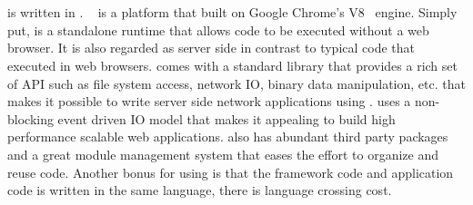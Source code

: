 








\section{\nodejs}

\cb is written in \nodejs.
\nodejs~\cite{tilkov2010node} is a platform that built on Google Chrome's V8~\cite{v8} \js engine.
Simply put, \nodejs is a standalone \js runtime that allows \js code to be
executed without a web browser.
It is also regarded as server side \js in contrast to typical \js code that executed in
web browsers.
\nodejs comes with a standard library that provides a rich set of API
such as file system access, network IO, binary data manipulation, etc.
that makes it possible to write server side network applications using \js.
\nodejs uses a non-blocking event driven IO model that makes it appealing to
build high performance scalable web applications.
\nodejs also has abundant third party packages
and a great module management system that eases the effort to organize and reuse code.
Another bonus for using \nodejs is that the \cb framework code and application code
is written in the same language, there is language crossing cost.


